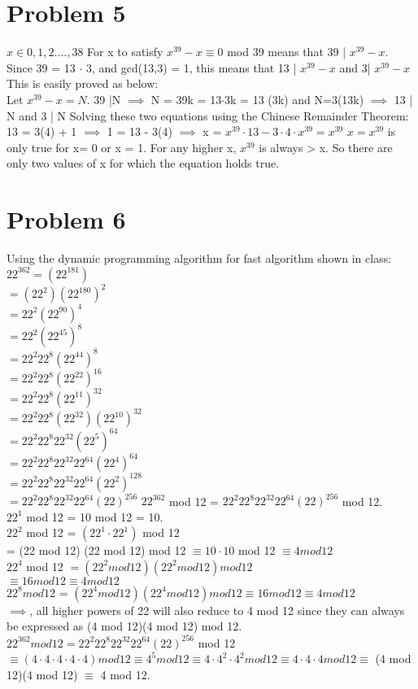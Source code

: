 \documentclass[english]{article}
\begin{document}
\section*{Problem 5}
$ x \in {0,1,2....,38}$ For x to satisfy $x^{39} - x \equiv 0 $ mod 39 means that 39 | $x^{39} - x$. \\ 
Since 39 = 13 $\cdot$ 3, and gcd(13,3) = 1, this means that 13 | $x^{39} - x$ and 3| $x^{39} - x$ \\
This is easily proved as below: \\
Let $x^{39} - x = N$. 39 |N $\implies$ N = 39k = 13$\cdot$3k = 13 (3k) and N=3(13k) $\implies$ 13 | N and 3 | N
Solving these two equations using the Chinese Remainder Theorem:\\
13 = 3(4) + 1 $\implies$ 1 = 13 - 3(4) $\implies$  x = $x^{39} \cdot 13 - 3 \cdot 4 \cdot x^{39} = x^{39}$
$x = x^{39}$ is only true for x= 0  or x = 1. For any higher x, $x^{39}$ is always > x. So there are only two values of x for which the equation holds true.
\section*{Problem 6}
Using the dynamic programming algorithm for fast algorithm shown in class:
$ 22^{362} = (22 ^ {181}) $\\$= (22^2) (22^{180})^2 $\\$= 22^2 (22^{90})^4 $\\$= 22^2 (22^{45})^8 $\\$= 22^2 22^8 (22^{44})^8 $\\$= 22^2 22^8 (22^{22})^{16} $\\$ = 22^2 22^8 (22^{11})^{32} $\\$ = 22^2 22^8 (22^{32}) (22^{10})^{32} $\\$ = 22^2 22^8 22^{32} (22^5)^{64} $\\$ = 22^2 22^8 22^{32} 22^{64} (22^4)^{64} $\\$ = 22^2 22^8 22^{32} 22^{64} (22^2)^{128} $\\$ = 22^2 22^8 22^{32} 22^{64} (22)^{256} $  
$ 22^{362}$ mod 12 = $22^2 22^8 22^{32} 22^{64} (22)^{256}$ mod 12. \\
$22^1$ mod 12  = 10 mod 12 = 10. \\
$22^2$ mod 12  = $(22^1 \cdot 22^1)$ mod 12 \\ = (22 mod 12) (22 mod 12) mod 12 $\equiv 10 \cdot 10$ mod 12 $\equiv 4 mod 12$
\\$22^4$ mod 12 $= (22^2 mod 12)(22^2 mod 12) mod 12$ \\ $ \equiv 16 mod 12 \equiv 4 mod 12$ 
\\$22^8 mod 12$ = $(22^4 mod 12)(22^4 mod 12) mod 12 \equiv 16 mod 12 \equiv 4 mod 12$
\\ $\implies$, all higher powers of 22 will also reduce to 4 mod 12 since they can always be expressed as (4 mod 12)(4 mod 12) mod 12.\\
$22^{362} mod 12 = 22^2 22^8 22^{32} 22^{64} (22)^{256}$ mod 12 $\equiv (4 \cdot 4 \cdot 4 \cdot 4 \cdot 4) mod 12 \equiv 4^5 mod 12 \equiv 4 \cdot 4^2 \cdot 4^2 mod 12 \equiv 4 \cdot 4 \cdot 4 mod 12 \equiv$ (4 mod 12)(4 mod 12) $\equiv$ 4 mod 12.
\end{document}
